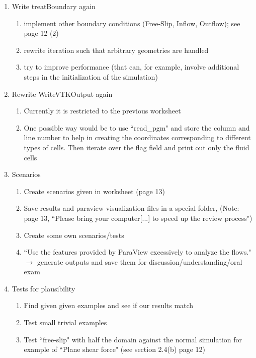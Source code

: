 \documentclass[a4paper]{article}
\newcommand{\qm}[1]{``#1"}							%
\newcommand{\ra}{\rightarrow}						%
\begin{document}
\begin{enumerate}
\item  Write treatBoundary again
\begin{enumerate}
\item implement other boundary conditions (Free-Slip, Inflow, Outflow); see page 12 (2)
\item rewrite iteration such that arbitrary geometries are handled
\item try to improve performance (that can, for example, involve additional steps in the initialization of the simulation)
\end{enumerate}

\item Rewrite WriteVTKOutput again
\begin{enumerate}
	\item Currently it is restricted to the previous worksheet
	\item One possible way would be to use \qm{read\_pgm} and store the column and line number to help in creating the coordinates corresponding to different types of cells. Then iterate over the flag field and print out only the fluid cells
\end{enumerate}

\item Scenarios
\begin{enumerate}
\item Create scenarios given in worksheet (page 13)
\item Save results and paraview visualization files in a special folder, (Note: page 13, \qm{Please bring your computer[...] to speed up the review process})
\item Create some own scenarios/tests
\item \qm{Use the features provided by ParaView excessively to analyze the flows.} $ \ra $ generate outputs and save them for discussion/understanding/oral exam
\end{enumerate}

\item Tests for plausibility
\begin{enumerate}
\item Find given given examples and see if our results match
\item Test small trivial examples
\item Test \qm{free-slip} with half the domain against the normal simulation for example of \qm{Plane shear force} (see section 2.4(b) page 12)
\end{enumerate}

\end{enumerate} 
\end{document}
